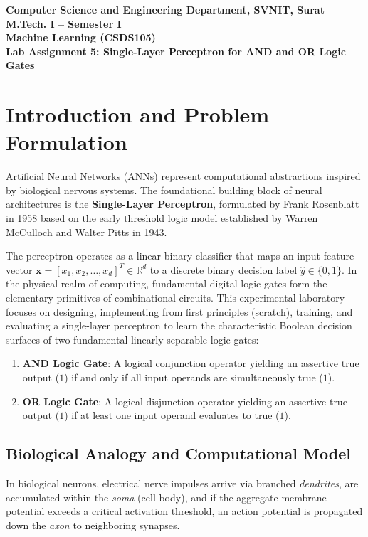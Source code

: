 \documentclass[12pt]{article}
\begin{document}

\begin{center}
\textbf{Computer Science and Engineering Department, SVNIT, Surat}\\
\textbf{M.Tech. I -- Semester I}\\
\textbf{Machine Learning (CSDS105)}\\
\textbf{Lab Assignment 5: Single-Layer Perceptron for AND and OR Logic Gates}
\end{center}

\vspace{0.3cm}

\section{Introduction and Problem Formulation}

Artificial Neural Networks (ANNs) represent computational abstractions inspired by biological nervous systems. The foundational building block of neural architectures is the \textbf{Single-Layer Perceptron}, formulated by Frank Rosenblatt in 1958 based on the early threshold logic model established by Warren McCulloch and Walter Pitts in 1943.

The perceptron operates as a linear binary classifier that maps an input feature vector $\mathbf{x} = [x_1, x_2, \dots, x_d]^T \in \mathbb{R}^d$ to a discrete binary decision label $\hat{y} \in \{0, 1\}$. In the physical realm of computing, fundamental digital logic gates form the elementary primitives of combinational circuits. This experimental laboratory focuses on designing, implementing from first principles (scratch), training, and evaluating a single-layer perceptron to learn the characteristic Boolean decision surfaces of two fundamental linearly separable logic gates:
\begin{enumerate}
    \item \textbf{AND Logic Gate}: A logical conjunction operator yielding an assertive true output ($1$) if and only if all input operands are simultaneously true ($1$).
    \item \textbf{OR Logic Gate}: A logical disjunction operator yielding an assertive true output ($1$) if at least one input operand evaluates to true ($1$).
\end{enumerate}

\subsection{Biological Analogy and Computational Model}
In biological neurons, electrical nerve impulses arrive via branched \textit{dendrites}, are accumulated within the \textit{soma} (cell body), and if the aggregate membrane potential exceeds a critical activation threshold, an action potential is propagated down the \textit{axon} to neighboring synapses. 
\end{document}

